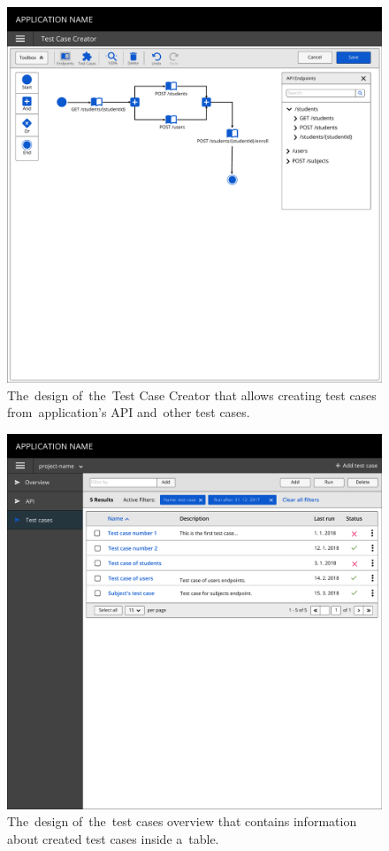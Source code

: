 \begin{figure}[!hbt]
	\centering
	\includegraphics[scale=0.57]{./designs/testCaseCreator.pdf}
	\caption{The~design of~the~Test Case Creator that allows creating test cases
	from~application's API and~other test cases.}
	\label{figCreateTest}
\end{figure}

\begin{figure}[!hbt]
	\centering
	\includegraphics[scale=0.57]{./designs/testCaseContainer.pdf}
	\caption{The~design of~the~test cases overview that contains information about
	created test cases inside a~table.}
	\label{figTestCaseContainer}
\end{figure}

